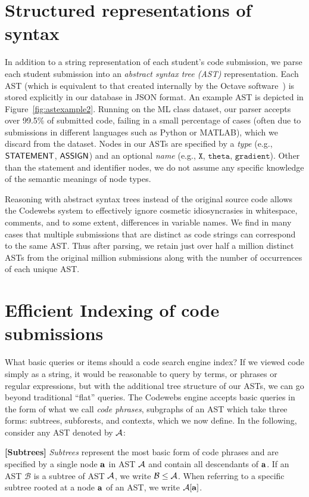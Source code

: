	
\section{Structured representations of syntax} 
In addition to a string representation of each student's code submission,
we parse each student submission into an \emph{abstract syntax tree (AST)} representation. 
Each AST (which is equivalent to that created internally by the Octave software~\cite{eaton97}) 
is stored explicitly in our database in JSON format.   An example AST is depicted in Figure~\ref{fig:astexample2}.
Running on the ML class dataset, our parser accepts over 99.5\% of  submitted code, failing in 
a small percentage of cases (often due to submissions in different languages such as Python or MATLAB),
which we discard from the dataset.  
Nodes in our ASTs are specified by a \emph{type} (e.g., ${\mathsf{STATEMENT}}$, ${\mathsf{ASSIGN}}$) and an optional \emph{name} (e.g., $\texttt{X}$, $\texttt{theta}$, 
$\texttt{gradient}$). 
Other than the statement and identifier nodes, we do not assume any specific knowledge of the semantic meanings of node types.

Reasoning with abstract syntax trees instead of the original source code allows the Codewebs system to effectively ignore
cosmetic idiosyncrasies in whitespace, comments, and to some extent, differences in variable 
names.   We find in many cases that multiple submissions that are distinct as code strings can correspond to the same AST.
Thus after parsing, we retain just over half a million distinct ASTs from the original million submissions along with the number
of occurrences of each unique AST.  

\section{Efficient Indexing of code submissions}\label{sec:indexing}
What basic queries or items should a code search engine index?
If we viewed code simply as a string, it would be reasonable to query by terms, or phrases or regular expressions,
but with the additional tree structure of our ASTs, we can go beyond traditional ``flat'' queries.
The Codewebs engine accepts basic queries in the form of what we call \emph{code phrases}, subgraphs of an AST
which take three forms: subtrees, subforests, and contexts, which we now define.  In the following, consider any AST denoted by $\mathcal{A}$:

\vspace{3mm}
{{\noindent \bf [Subtrees]}} \emph{Subtrees} represent the most basic form of code phrases and 
are specified by a single node ${\bf a}$ in AST $\mathcal{A}$ and contain all descendants of ${\bf a}$.
If an AST $\mathcal{B}$ is a subtree of AST $\mathcal{A}$, we write $\mathcal{B} \leq \mathcal{A}$.
When referring to a specific subtree rooted at a node ${\bf a}$ of an AST, we write $\mathcal{A}[{\bf a}]$.

